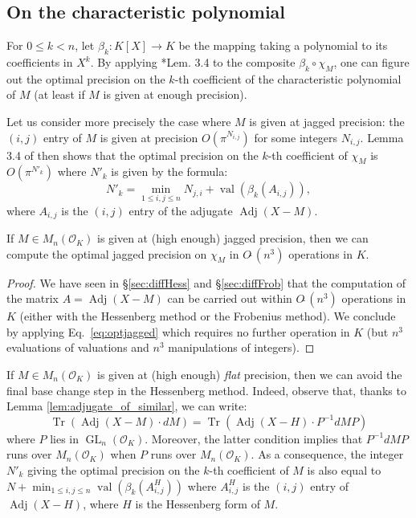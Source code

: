 \documentclass{sig-alternate-05-2015}
\DeclareMathOperator{\GL}{GL}
\DeclareMathOperator{\val}{val}
\DeclareMathOperator{\tr}{Tr}
\DeclareMathOperator{\adj}{Adj}
\newcommand{\OK}{\mathcal{O}_K}
\newcommand{\softO}{O\tilde{~}}
\begin{document}
\subsection{On the characteristic polynomial}

For $0 \leq k < n$, let $\beta_k : K[X] \to K$ be the mapping taking a 
polynomial to its coefficients in $X^k$. By applying 
\cite{caruso-roe-vaccon:14a}*{Lem. 3.4} to the composite $\beta_k 
\circ \chi_M$, one can figure out the optimal precision on the
$k$-th coefficient of the characteristic polynomial of $M$ (at
least if $M$ is given at enough precision).

Let us consider more precisely the case where $M$ is given at 
jagged precision: the $(i,j)$ entry of $M$ is given at precision 
$O(\pi^{N_{i,j}})$ for some integers $N_{i,j}$. 
Lemma 3.4 of \cite{caruso-roe-vaccon:14a} then shows that
the optimal precision on the $k$-th coefficient of $\chi_M$ is 
$O(\pi^{N'_k})$ where $N'_k$ is given by the formula:
\begin{equation}
\label{eq:optjagged}
N'_k = \min_{1 \leq i, j\leq n} N_{j,i} + \val(\beta_k(A_{i,j})),
\end{equation}
where $A_{i,j}$ is the $(i,j)$ entry of the adjugate $\adj(X{-}M)$.

\begin{prop} \label{prop:optimal_jagged}
If $M \in M_n(\OK)$ is given at (high enough) jagged precision, 
then we can compute the optimal jagged precision on $\chi_M$ in 
$\softO (n^3)$ operations in $K$.
\end{prop}

\begin{proof}
We have seen in \S \ref{sec:diffHess} and \S \ref{sec:diffFrob}
that the computation of the matrix $A = \adj(X{-}M)$ can be carried out 
within $\softO(n^3)$ operations in $K$ (either with the Hessenberg 
method or the Frobenius method). We conclude by applying 
Eq.~\eqref{eq:optjagged} which requires no further operation in $K$
(but $n^3$ evaluations of valuations and $n^3$ manipulations of 
integers).
\end{proof}

\begin{rem}
If $M \in M_n(\OK)$ is given at (high enough) \emph{flat} precision, 
then we can avoid the final base change step in the Hessenberg method.
Indeed, observe that, thanks to Lemma \ref{lem:adjugate_of_similar}, 
we can write:
$$\tr(\adj (X{-}M) \cdot dM)=\tr(\adj (X{-}H)\cdot P^{-1} dM P)$$
where $P$ lies in $\GL_n(\OK)$. Moreover, the latter condition implies
that $P^{-1} dM P$ runs over $M_n(\OK)$ when $P$ runs over $M_n(\OK)$.
As a consequence, the integer $N'_k$ giving the optimal precision on the 
$k$-th coefficient of $M$ is also equal to
$N + \min_{1 \leq i, j\leq n} \val(\beta_k(A^H_{i,j}))$
where $A^H_{i,j}$ is the $(i,j)$ entry of $\adj(X{-}H)$,
where $H$ is the Hessenberg form of $M$.
\end{rem}
\end{document}
